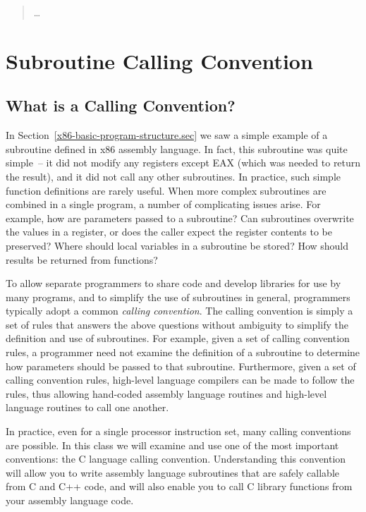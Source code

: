 \begin{quotation}
\ldots
\end{quotation}

\section{Subroutine Calling Convention}

\subsection{What is a Calling Convention?}

In Section~\ref{x86-basic-program-structure.sec} we saw a simple
example of a subroutine defined in x86 assembly language. In fact,
this subroutine was quite simple~-- it did not modify any registers
except EAX (which was needed to return the result), and it did not
call any other subroutines. In practice, such simple function
definitions are rarely useful. When more complex subroutines are
combined in a single program, a number of complicating issues arise.
For example, how are parameters passed to a subroutine? Can
subroutines overwrite the values in a register, or does the caller
expect the register contents to be preserved? Where should local
variables in a subroutine be stored? How should results be returned
from functions?

To allow separate programmers to share code and develop libraries for
use by many programs, and to simplify the use of subroutines in
general, programmers typically adopt a common {\em calling
  convention}. The calling convention is simply a set of rules that
answers the above questions without ambiguity to simplify the
definition and use of subroutines. For example, given a set of calling
convention rules, a programmer need not examine the definition of a
subroutine to determine how parameters should be passed to that
subroutine. Furthermore, given a set of calling convention rules,
high-level language compilers can be made to follow the rules, thus
allowing hand-coded assembly language routines and high-level language
routines to call one another.

In practice, even for a single processor instruction set, many calling
conventions are possible.  In this class we will examine and use one
of the most important conventions: the C language calling convention.
Understanding this convention will allow you to write assembly
language subroutines that are safely callable from C and C++ code, and
will also enable you to call C library functions from your assembly
language code.

